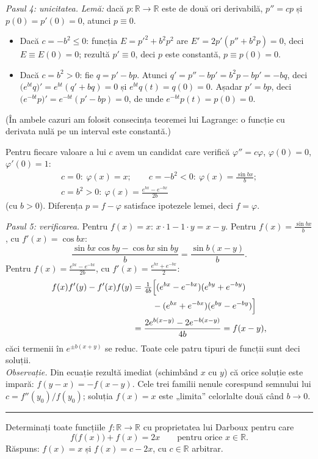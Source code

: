 \emph{Pasul 4: unicitatea.} \emph{Lemă:} dacă $p:\mathbb{R}\to\mathbb{R}$ este de două ori derivabilă, $p''=cp$ și $p(0)=p'(0)=0$, atunci $p\equiv0$.
\begin{itemize}[leftmargin=*, itemsep=1pt]
  \item Dacă $c=-b^2\le0$: funcția $E=p'^2+b^2p^2$ are $E'=2p'(p''+b^2p)=0$, deci $E\equiv E(0)=0$; rezultă $p'\equiv0$, deci $p$ este constantă, $p\equiv p(0)=0$.
  \item Dacă $c=b^2>0$: fie $q=p'-bp$. Atunci $q'=p''-bp'=b^2p-bp'=-bq$, deci $\bigl(e^{bt}q\bigr)'=e^{bt}(q'+bq)=0$ și $e^{bt}q(t)=q(0)=0$. Așadar $p'=bp$, deci $\bigl(e^{-bt}p\bigr)'=e^{-bt}(p'-bp)=0$, de unde $e^{-bt}p(t)=p(0)=0$.
\end{itemize}
(În ambele cazuri am folosit consecința teoremei lui Lagrange: o funcție cu derivata nulă pe un interval este constantă.)

Pentru fiecare valoare a lui $c$ avem un candidat care verifică $\varphi''=c\varphi$, $\varphi(0)=0$, $\varphi'(0)=1$:
\[ \begin{gathered} c=0:\ \varphi(x)=x;\qquad c=-b^2<0:\ \varphi(x)=\frac{\sin bx}{b};\\ c=b^2>0:\ \varphi(x)=\frac{e^{bx}-e^{-bx}}{2b} \end{gathered} \]
(cu $b>0$). Diferența $p=f-\varphi$ satisface ipotezele lemei, deci $f=\varphi$.

\emph{Pasul 5: verificarea.} Pentru $f(x)=x$: $x\cdot1-1\cdot y=x-y$. Pentru $f(x)=\frac{\sin bx}{b}$, cu $f'(x)=\cos bx$:
\[ \frac{\sin bx\cos by-\cos bx\sin by}{b}=\frac{\sin b(x-y)}{b} . \]
Pentru $f(x)=\frac{e^{bx}-e^{-bx}}{2b}$, cu $f'(x)=\frac{e^{bx}+e^{-bx}}{2}$:
\[ \begin{aligned} f(x)f'(y)-f'(x)f(y)&=\tfrac{1}{4b}\Bigl[(e^{bx}-e^{-bx})(e^{by}+e^{-by})\\ &\qquad\ -(e^{bx}+e^{-bx})(e^{by}-e^{-by})\Bigr]\\ &=\frac{2e^{b(x-y)}-2e^{-b(x-y)}}{4b}=f(x-y) , \end{aligned} \]
căci termenii în $e^{\pm b(x+y)}$ se reduc. Toate cele patru tipuri de funcții sunt deci soluții.\\[2pt]
\emph{Observație.} Din ecuație rezultă imediat (schimbând $x$ cu $y$) că orice soluție este impară: $f(y-x)=-f(x-y)$. Cele trei familii nenule corespund semnului lui $c=f''(y_0)/f(y_0)$; soluția $f(x)=x$ este „limita'' celorlalte două când $b\to0$.
\vspace{1mm}\hrule

Determinați toate funcțiile $f:\mathbb{R}\to\mathbb{R}$ cu proprietatea lui Darboux pentru care
\[ f\bigl(f(x)\bigr)+f(x)=2x\qquad\text{pentru orice }x\in\mathbb{R} . \]
\sol Răspuns: $f(x)=x$ și $f(x)=c-2x$, cu $c\in\mathbb{R}$ arbitrar.

